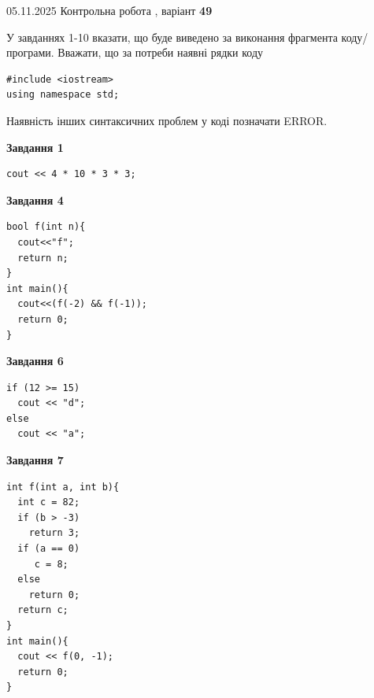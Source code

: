 \documentclass[12pt, ukrainian]{article}
\begin{document}
{\Large{05.11.2025 Контрольна робота , варіант  \No \textbf { 49 }\par}}
{
\begin {large}
У завданнях 1-10 вказати, що буде виведено за виконання фрагмента коду/про\-гра\-ми.
Вважати, що за потреби наявні рядки коду
\begin{verbatim}
#include <iostream>
using namespace std;
\end{verbatim}
Наявність інших синтаксичних проблем у коді позначати ERROR.

\begin{minipage}[t]{7.0cm}

\begin{center}
\textbf{Завдання 1}
\end{center}
\vspace{-8mm}

\begin{verbatim}
cout << 4 * 10 * 3 * 3;
\end{verbatim}



\begin{center}
\textbf{Завдання 4}
\end{center}
\vspace{-8mm}

\begin{verbatim}
bool f(int n){
  cout<<"f";
  return n;
}
int main(){
  cout<<(f(-2) && f(-1));
  return 0;
}
\end{verbatim}



\begin{center}
\textbf{Завдання 6}
\end{center}
\vspace{-8mm}

\begin{verbatim}
if (12 >= 15)
  cout << "d";
else
  cout << "a";
\end{verbatim}



\begin{center}
\textbf{Завдання 7}
\end{center}
\vspace{-8mm}

\begin{verbatim}
int f(int a, int b){
  int c = 82;
  if (b > -3)
    return 3;
  if (a == 0)
     c = 8;
  else
    return 0;
  return c;
}
int main(){
  cout << f(0, -1);
  return 0;
}
\end{verbatim}


\end{minipage}
\end{large}}
\end{document}
